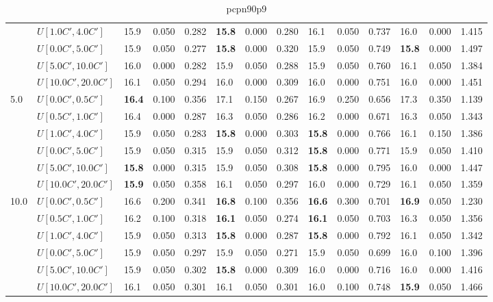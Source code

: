 \begin{table}[h]
{\begin{tabular}{|l|l||l|l|l||l|l|l||l|l|l||l|l|l|}
       & $U[1.0C',4.0C']$ & 15.9 & 0.050 & 0.282 & \textbf{15.8} & 0.000 & 0.280 & 16.1 & 0.050 & 0.737 & 16.0 & 0.000 & 1.415 \\
       & $U[0.0C',5.0C']$ & 15.9 & 0.050 & 0.277 & \textbf{15.8} & 0.000 & 0.320 & 15.9 & 0.050 & 0.749 & \textbf{15.8} & 0.000 & 1.497 \\
       & $U[5.0C',10.0C']$ & 16.0 & 0.000 & 0.282 & 15.9 & 0.050 & 0.288 & 15.9 & 0.050 & 0.760 & 16.1 & 0.050 & 1.384 \\
       & $U[10.0C',20.0C']$ & 16.1 & 0.050 & 0.294 & 16.0 & 0.000 & 0.309 & 16.0 & 0.000 & 0.751 & 16.0 & 0.000 & 1.451 \\
      \hline\hline
      \multirow{6}{*}{5.0} & $U[0.0C',0.5C']$ & \textbf{16.4} & 0.100 & 0.356 & 17.1 & 0.150 & 0.267 & 16.9 & 0.250 & 0.656 & 17.3 & 0.350 & 1.139 \\
       & $U[0.5C',1.0C']$ & 16.4 & 0.000 & 0.287 & 16.3 & 0.050 & 0.286 & 16.2 & 0.000 & 0.671 & 16.3 & 0.050 & 1.343 \\
       & $U[1.0C',4.0C']$ & 15.9 & 0.050 & 0.283 & \textbf{15.8} & 0.000 & 0.303 & \textbf{15.8} & 0.000 & 0.766 & 16.1 & 0.150 & 1.386 \\
       & $U[0.0C',5.0C']$ & 15.9 & 0.050 & 0.315 & 15.9 & 0.050 & 0.312 & \textbf{15.8} & 0.000 & 0.771 & 15.9 & 0.050 & 1.410 \\
       & $U[5.0C',10.0C']$ & \textbf{15.8} & 0.000 & 0.315 & 15.9 & 0.050 & 0.308 & \textbf{15.8} & 0.000 & 0.795 & 16.0 & 0.000 & 1.447 \\
       & $U[10.0C',20.0C']$ & \textbf{15.9} & 0.050 & 0.358 & 16.1 & 0.050 & 0.297 & 16.0 & 0.000 & 0.729 & 16.1 & 0.050 & 1.359 \\
      \hline\hline
      \multirow{6}{*}{10.0} & $U[0.0C',0.5C']$ & 16.6 & 0.200 & 0.341 & \textbf{16.8} & 0.100 & 0.356 & \textbf{16.6} & 0.300 & 0.701 & \textbf{16.9} & 0.050 & 1.230 \\
       & $U[0.5C',1.0C']$ & 16.2 & 0.100 & 0.318 & \textbf{16.1} & 0.050 & 0.274 & \textbf{16.1} & 0.050 & 0.703 & 16.3 & 0.050 & 1.356 \\
       & $U[1.0C',4.0C']$ & 15.9 & 0.050 & 0.313 & \textbf{15.8} & 0.000 & 0.287 & \textbf{15.8} & 0.000 & 0.792 & 16.1 & 0.050 & 1.342 \\
       & $U[0.0C',5.0C']$ & 15.9 & 0.050 & 0.297 & 15.9 & 0.050 & 0.271 & 15.9 & 0.050 & 0.699 & 16.0 & 0.100 & 1.396 \\
       & $U[5.0C',10.0C']$ & 15.9 & 0.050 & 0.302 & \textbf{15.8} & 0.000 & 0.309 & 16.0 & 0.000 & 0.716 & 16.0 & 0.000 & 1.416 \\
       & $U[10.0C',20.0C']$ & 16.1 & 0.050 & 0.301 & 16.1 & 0.050 & 0.301 & 16.0 & 0.100 & 0.748 & \textbf{15.9} & 0.050 & 1.466 \\
      \hline
      \end{tabular}
      }
      \caption{pcpn90p9}
      \label{tab:pcpn90p9}\end{table}      
      

